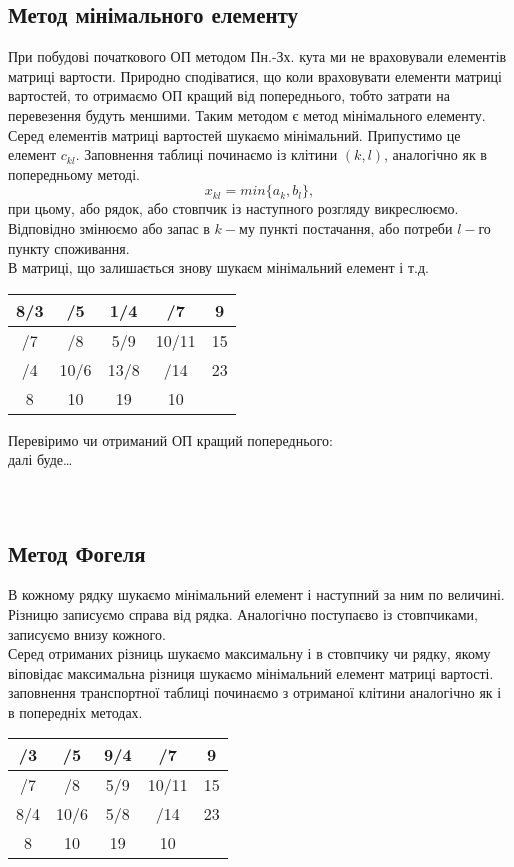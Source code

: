 \documentclass[12pt]{book}
\begin{document}
\subsection{Метод мінімального елементу}
При побудові початкового ОП методом Пн.-Зх. кута ми не враховували елементів матриці вартости. Природно сподіватися, що коли враховувати елементи матриці вартостей, то отримаємо ОП кращий від попереднього, тобто затрати на перевезення будуть меншими. Таким методом є метод мінімального елементу.\\
Серед елементів матриці вартостей шукаємо мінімальний. Припустимо це елемент $c_{kl}$. Заповнення таблиці починаємо із клітини $(k,l)$, аналогічно як в попередньому методі.
$$x_{kl} = min\{a_k,b_l\},$$
при цьому, або рядок, або стовпчик із наступного розгляду викреслюємо. Відповідно змінюємо або запас в $k-$му пункті постачання, або потреби $l-$го пункту споживання.\\
В матриці, що залишається знову шукаєм мінімальний елемент і т.д.\\
\begin{tabular}{ | c | c | c | c | c |}
\hline
8/3	&	/5	&	1/4	&	/7		&	9\\
\hline
/7	&	/8	&	5/9	&	10/11	&	15\\
\hline
/4	&	10/6	&	13/8	&	/14		&	23\\
\hline
8	&	10	&	19	&	10		&\\
\hline
\end{tabular}
Перевіримо чи отриманий ОП кращий попереднього:\\
далі буде\dots\\
\\
\\
\subsection{Метод Фогеля}
В кожному рядку шукаємо мінімальний елемент і наступний за ним по величині. Різницю записуємо справа від рядка. Аналогічно поступаєво із стовпчиками, записуємо внизу кожного.\\
Серед отриманих різниць шукаємо максимальну і в стовпчику чи рядку, якому віповідає максимальна різниця шукаємо мінімальний елемент матриці вартості.\\
заповнення транспортної таблиці починаємо з отриманої клітини аналогічно як і в попередніх методах.\\
\begin{tabular}{ | c | c | c | c | c |}
\hline
/3	&	/5	&	9/4	&	/7		&	9\\
\hline
/7	&	/8	&	5/9	&	10/11	&	15\\
\hline
8/4	&	10/6	&	5/8	&	/14		&	23\\
\hline
8	&	10	&	19	&	10		&\\
\hline
\end{tabular}
\end{document}
